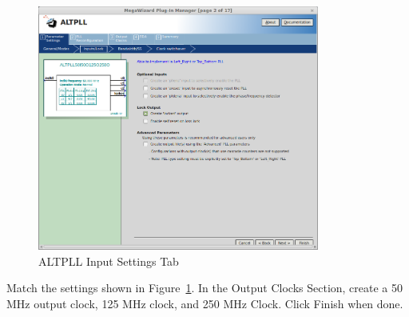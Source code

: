\documentclass{refrep}
\begin{document}
\begin{figure}[H]
  \includegraphics[width=350px,center]{ALTPLLTabInputs.png}
  \caption{ALTPLL Input Settings Tab}
  \label{Fig:Altera:ALTPLL:TabInputs}
\end{figure}
Match the settings shown in Figure~\ref{Fig:Altera:ALTPLL:TabInputs}. In the
Output Clocks Section, create a 50 MHz output clock, 125 MHz clock, and 250 MHz
Clock. Click Finish when done.

\end{document}
